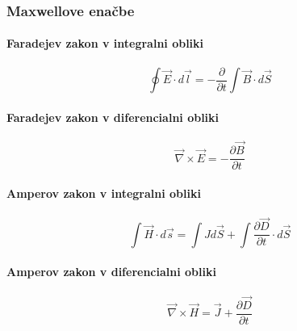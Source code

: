 \documentclass[a4paper,12pt]{article}
\begin{document}
\subsubsection{Maxwellove enačbe}
\begin{multicols}{2}
    \paragraph{Faradejev zakon v integralni obliki}
    \begin{equation}
        \label{eq:faradejev_zakon_integralna}
        \oint \vec{E} \cdot d\vec{l} = -\frac{\partial}{\partial t} \int \vec{B} \cdot d\vec{S}
    \end{equation}

    \paragraph{Faradejev zakon v diferencialni obliki}
    \begin{equation}
        \label{eq:faradejev_zakon_diferencialna}
        \vec{\nabla} \times \vec{E} = -\frac{\partial \vec{B}}{\partial t}
    \end{equation}

    \paragraph{Amperov zakon v integralni obliki}
    \begin{equation}
        \label{eq:amperov_zakon_integralna}
        \int \vec{H} \cdot d\vec{s} = \int J d\vec{S} + \int \frac{\partial \vec{D}}{\partial t} \cdot d\vec{S}
    \end{equation}

    \paragraph{Amperov zakon v diferencialni obliki}
    \begin{equation}
        \label{eq:amperov_zakon_diferencialna}
        \vec{\nabla} \times \vec{H} = \vec{J} + \frac{\partial \vec{D}}{\partial t}
    \end{equation}

\end{multicols}
\end{document}

